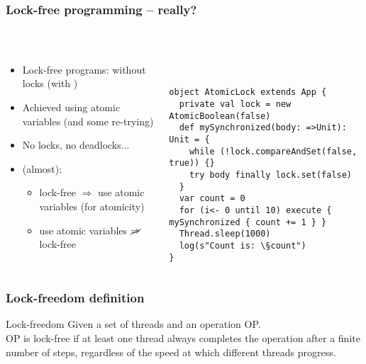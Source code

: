 \documentclass[aspectratio=169]{beamer}
\begin{document}
\begin{frame}[fragile]\frametitle{Lock-free programming -- really?}
~\\[-8mm]
\begin{columns}
\begin{column}{0.48\textwidth}
\begin{itemize}
  \item \alert{Lock-free programs}: without locks (with )
  \item Achieved using \alert{atomic variables} (and some re-trying)
  \item No locks, no deadlocks...
  \pause
  \item (almost):
    \begin{itemize}
      \item lock-free $\Rightarrow$ use atomic variables (for atomicity)
      \item use atomic variables $\cancel\Rightarrow$ lock-free
    \end{itemize}
  \pause
\end{itemize}
\end{column}
\begin{column}{0.54\textwidth}
~\\
\begin{lstlisting}[emph={execute,sleep,log,compareAndSet,mySynchronized,AtomicBoolean}]
object AtomicLock extends App {
  private val lock = new AtomicBoolean(false)
  def mySynchronized(body: =>Unit): Unit = {
    while (!lock.compareAndSet(false, true)) {}
    try body finally lock.set(false)
  }
  var count = 0
  for (i<- 0 until 10) execute { mySynchronized { count += 1 } }
  Thread.sleep(1000)
  log(s"Count is: \§count")
}
\end{lstlisting}
\end{column}
\end{columns}
\end{frame}  


\begin{frame}\frametitle{Lock-freedom definition}

\begin{alertblock}{Lock-freedom}
  Given a set of threads and an operation OP.
  \\
  \alert{OP is lock-free} if at least one thread always completes the operation after a finite number of steps, regardless of the speed at which different threads progress.
\end{alertblock}
\end{frame}
\end{document}
